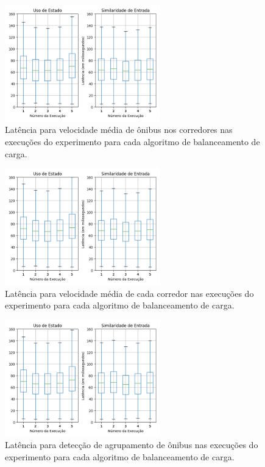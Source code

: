 \begin{figure}[p]
  \centering
\includegraphics[width=0.6\textwidth]{figuras/graphics/boxplot_agg_vel.png}
\caption{Latência para velocidade média de ônibus nos corredores nas execuções do experimento para cada algoritmo de balanceamento de carga.}
\label{fig:boxplot_vel_agg}
\end{figure}

\begin{figure}[p]
\centering
\includegraphics[width=0.6\textwidth]{figuras/graphics/boxplot_agg_corr.png}
 \caption{Latência para velocidade média de cada corredor nas execuções do experimento para cada algoritmo de balanceamento de carga.}
 \label{fig:boxplot_corr_agg}
\end{figure}
\afterpage{\clearpage}
\begin{figure}[p]

\centering
\includegraphics[width=0.6\textwidth]{figuras/graphics/boxplot_agg_BusB.png}
\caption{Latência para detecção de agrupamento de ônibus nas execuções do experimento para cada algoritmo de balanceamento de carga.}
\label{fig:boxplot_BusB_agg}

\end{figure}

